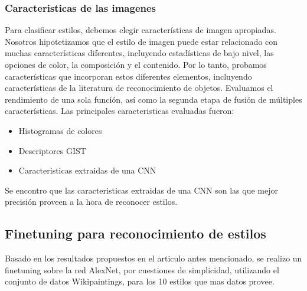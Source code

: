 \documentclass[a4paper,10pt]{article}
\begin{document}
    \subsubsection{Caracteristicas de las imagenes}
	Para clasificar estilos, debemos elegir características de imagen apropiadas. Nosotros hipotetizamos que el estilo de imagen puede estar relacionado con muchas características diferentes, 
	incluyendo estadísticas de bajo nivel, las opciones de color, la composición y el contenido. Por lo tanto, probamos características que incorporan estos diferentes elementos, incluyendo características de la 
	literatura de reconocimiento de objetos. Evaluamos el rendimiento de una sola función, así como la segunda etapa de fusión de múltiples características.
	Las principales caracteristicas evaluadas fueron:
	\begin{itemize}
	 \item Histogramas de colores
	 \item Descriptores GIST
	 \item Caracteristicas extraidas de una CNN
	\end{itemize}
	Se encontro que las caracteristicas extraidas de una CNN son las que mejor precisión proveen a la hora de reconocer estilos.

  \subsection{Finetuning para reconocimiento de estilos}
    Basado en los resultados propuestos en el articulo antes mencionado, se realizo un finetuning sobre la red AlexNet, por cuestiones de simplicidad, utilizando
    el conjunto de datos Wikipaintings, para los 10 estilos que mas datos provee.
\end{document}
